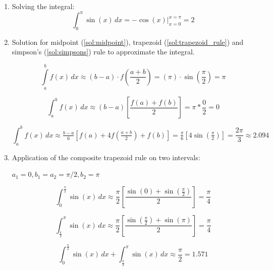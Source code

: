 \begin{enumerate}
	\item Solving the integral:
	\begin{equation}
\int_0^\pi \sin(x) \, dx = -\cos(x) \Big|_{x=0}^{x=\pi} = 2
\label{sol:int}
\end{equation}
	
	\item Solution for midpoint (\ref{sol:midpoint}), trapezoid (\ref{sol:trapezoid_rule}) and simpson's (\ref{sol:simpsons}) rule to approximate the integral.	
	
	\begin{equation}
\int\limits_{a}^{b} f(x)\, dx \approx (b - a) \cdot f\!\left(\frac{a + b}{2}\right) 
= (\pi) \cdot \sin{\!\left(\frac{\pi}{2}\right)} = \pi
 \label{sol:midpoint}
\end{equation}
	
	\begin{equation}
 \int_{a}^{b} f(x)\, dx \approx (b-a) \left[\frac{f(a) + f(b)}{2} \right] = \pi * \frac{0}{2} = 0
 \label{sol:trapezoid_rule}
\end{equation}
	
	
	\begin{equation}
 \int_{a}^{b} f(x) \, dx \approx \tfrac{b-a}{6}\left[f(a) + 4f\left(\tfrac{a+b}{2}\right)+f(b)\right]
 = \tfrac{\pi}{6}\left[4 \sin \left(\tfrac{\pi}{2}\right)\right] =  \frac{2 \pi}{3} \approx 2.094
\label{sol:simpsons}
\end{equation}
	
	
	\item Application of the composite trapezoid rule on two intervals:
	
	$a_1 = 0, b_1 = a_2 = \pi / 2, b_2 = \pi$
	
	\begin{equation}
 \int_{0}^{\frac{\pi}{2}} \sin(x)\, dx \approx \frac{\pi}{2} \left[\frac{\sin(0) + \sin(\frac{\pi}{2})}{2} \right] = \frac{\pi}{4}
 \label{sol:trleft}
\end{equation}

\begin{equation}
 \int_{\frac{\pi}{2}}^{\pi} \sin(x)\, dx \approx \frac{\pi}{2} \left[\frac{\sin(\frac{\pi}{2}) + \sin(\pi)}{2} \right] = \frac{\pi}{4}
 \label{sol:trright}
\end{equation}

\begin{equation}
 \int_{0}^{\frac{\pi}{2}} \sin(x)\, dx + \int_{\frac{\pi}{2}}^{\pi} \sin(x)\, dx \approx \frac{\pi}{2} = 1.571
 \label{sol:add}
\end{equation}


\end{enumerate}
